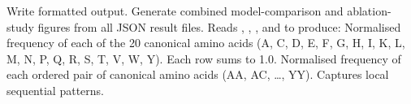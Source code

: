 Write formatted output.\markdownRendererOlItemEnd 
\markdownRendererOlEndTight \markdownRendererInterblockSeparator
{}\markdownRendererThematicBreak{}\markdownRendererInterblockSeparator
{}
\markdownRendererSectionEnd \markdownRendererSectionBegin
{}\markdownRendererInterblockSeparator
{} Generate combined model-comparison and ablation-study figures from all JSON result files.\markdownRendererParagraphSeparator
{}Reads , , , and\markdownRendererSoftLineBreak
{} to produce:\markdownRendererInterblockSeparator
{}\markdownRendererUlBeginTight
\markdownRendererUlItem {}\markdownRendererUlItemEnd 
\markdownRendererUlItem {}\markdownRendererUlItemEnd 
\markdownRendererUlEndTight \markdownRendererInterblockSeparator
{}\markdownRendererThematicBreak{}\markdownRendererInterblockSeparator
{}
\markdownRendererSectionEnd 
\markdownRendererSectionEnd \markdownRendererSectionBegin
{}\markdownRendererInterblockSeparator
{}\markdownRendererInterblockSeparator
{}\markdownRendererThematicBreak{}\markdownRendererInterblockSeparator
{}
\markdownRendererSectionEnd \markdownRendererSectionBegin
{}\markdownRendererInterblockSeparator
{}\markdownRendererSectionBegin
{}\markdownRendererInterblockSeparator
{} Normalised frequency of each of the 20 canonical amino acids\markdownRendererSoftLineBreak
{}(A, C, D, E, F, G, H, I, K, L, M, N, P, Q, R, S, T, V, W, Y). Each row sums to \markdownRendererTilde{}1.0.\markdownRendererParagraphSeparator
{} Normalised frequency of each ordered pair of canonical amino\markdownRendererSoftLineBreak
{}acids (AA, AC, …, YY). Captures local sequential patterns.\markdownRendererParagraphSeparator

